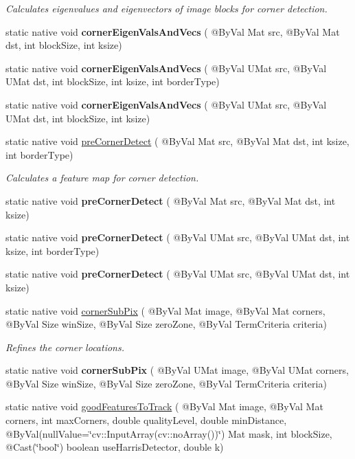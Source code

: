 \begin{DoxyCompactItemize}
\begin{DoxyCompactList}\small\item\em Calculates eigenvalues and eigenvectors of image blocks for corner detection. \end{DoxyCompactList}\item 
static native void {\bfseries corner\+Eigen\+Vals\+And\+Vecs} ( @By\+Val Mat src, @By\+Val Mat dst, int block\+Size, int ksize)
\item 
static native void {\bfseries corner\+Eigen\+Vals\+And\+Vecs} ( @By\+Val U\+Mat src, @By\+Val U\+Mat dst, int block\+Size, int ksize, int border\+Type)
\item 
static native void {\bfseries corner\+Eigen\+Vals\+And\+Vecs} ( @By\+Val U\+Mat src, @By\+Val U\+Mat dst, int block\+Size, int ksize)
\item 
static native void \hyperlink{group__imgproc__feature_ga1c51e6cab3684b202f45967edc555f5c}{pre\+Corner\+Detect} ( @By\+Val Mat src, @By\+Val Mat dst, int ksize, int border\+Type)
\begin{DoxyCompactList}\small\item\em Calculates a feature map for corner detection. \end{DoxyCompactList}\item 
static native void {\bfseries pre\+Corner\+Detect} ( @By\+Val Mat src, @By\+Val Mat dst, int ksize)
\item 
static native void {\bfseries pre\+Corner\+Detect} ( @By\+Val U\+Mat src, @By\+Val U\+Mat dst, int ksize, int border\+Type)
\item 
static native void {\bfseries pre\+Corner\+Detect} ( @By\+Val U\+Mat src, @By\+Val U\+Mat dst, int ksize)
\item 
static native void \hyperlink{group__imgproc__feature_ga45fec6a2998978719aaedb9aad2cbae6}{corner\+Sub\+Pix} ( @By\+Val Mat image, @By\+Val Mat corners, @By\+Val Size win\+Size, @By\+Val Size zero\+Zone, @By\+Val Term\+Criteria criteria)
\begin{DoxyCompactList}\small\item\em Refines the corner locations. \end{DoxyCompactList}\item 
static native void {\bfseries corner\+Sub\+Pix} ( @By\+Val U\+Mat image, @By\+Val U\+Mat corners, @By\+Val Size win\+Size, @By\+Val Size zero\+Zone, @By\+Val Term\+Criteria criteria)
\item 
static native void \hyperlink{group__imgproc__feature_gac59ef9f79071cae35c509e388d80e4f5}{good\+Features\+To\+Track} ( @By\+Val Mat image, @By\+Val Mat corners, int max\+Corners, double quality\+Level, double min\+Distance, @By\+Val(null\+Value=\char`\"{}cv\+::\+Input\+Array(cv\+::no\+Array())\char`\"{}) Mat mask, int block\+Size, @Cast(\char`\"{}bool\char`\"{}) boolean use\+Harris\+Detector, double k)

\end{DoxyCompactItemize}
